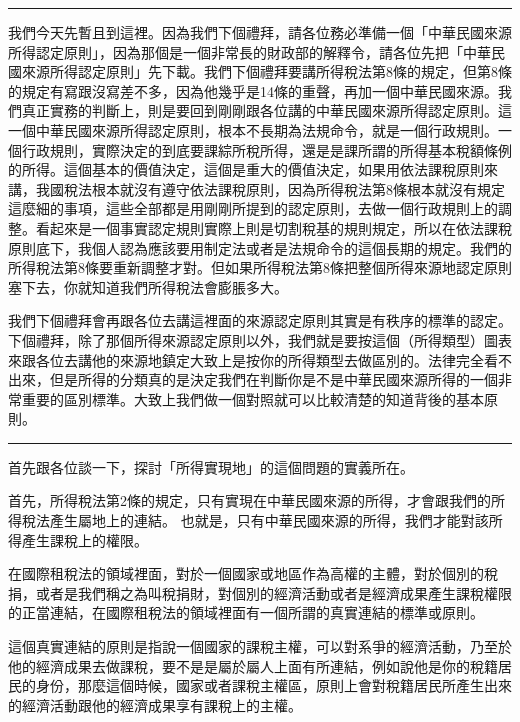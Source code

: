 \documentclass[oneside,sub3section]{ctexbook}
\begin{document}
\begin{center}\rule{0.5\linewidth}{0.5pt}\end{center}

我們今天先暫且到這裡。因為我們下個禮拜，請各位務必準備一個「中華民國來源所得認定原則」，因為那個是一個非常長的財政部的解釋令，請各位先把「中華民國來源所得認定原則」先下載。我們下個禮拜要講所得稅法第8條的規定，但第8條的規定有寫跟沒寫差不多，因為他幾乎是14條的重聲，再加一個中華民國來源。我們真正實務的判斷上，則是要回到剛剛跟各位講的中華民國來源所得認定原則。這一個中華民國來源所得認定原則，根本不長期為法規命令，就是一個行政規則。一個行政規則，實際決定的到底要課綜所稅所得，還是是課所謂的所得基本稅額條例的所得。這個基本的價值決定，這個是重大的價值決定，如果用依法課稅原則來講，我國稅法根本就沒有遵守依法課稅原則，因為所得稅法第8條根本就沒有規定這麼細的事項，這些全部都是用剛剛所提到的認定原則，去做一個行政規則上的調整。看起來是一個事實認定規則實際上則是切割稅基的規則規定，所以在依法課稅原則底下，我個人認為應該要用制定法或者是法規命令的這個長期的規定。我們的所得稅法第8條要重新調整才對。但如果所得稅法第8條把整個所得來源地認定原則塞下去，你就知道我們所得稅法會膨脹多大。

我們下個禮拜會再跟各位去講這裡面的來源認定原則其實是有秩序的標準的認定。下個禮拜，除了那個所得來源認定原則以外，我們就是要按這個（所得類型）圖表來跟各位去講他的來源地鎮定大致上是按你的所得類型去做區別的。法律完全看不出來，但是所得的分類真的是決定我們在判斷你是不是中華民國來源所得的一個非常重要的區別標準。大致上我們做一個對照就可以比較清楚的知道背後的基本原則。

\begin{center}\rule{0.5\linewidth}{0.5pt}\end{center}

首先跟各位談一下，探討「所得實現地」的這個問題的實義所在。

首先，所得稅法第2條的規定，只有實現在中華民國來源的所得，才會跟我們的所得稅法產生屬地上的連結。
也就是，只有中華民國來源的所得，我們才能對該所得產生課稅上的權限。

在國際租稅法的領域裡面，對於一個國家或地區作為高權的主體，對於個別的稅捐，或者是我們稱之為叫稅捐財，對個別的經濟活動或者是經濟成果產生課稅權限的正當連結，在國際租稅法的領域裡面有一個所謂的真實連結的標準或原則。

這個真實連結的原則是指說一個國家的課稅主權，可以對系爭的經濟活動，乃至於他的經濟成果去做課稅，要不是是屬於屬人上面有所連結，例如說他是你的稅籍居民的身份，那麼這個時候，國家或者課稅主權區，原則上會對稅籍居民所產生出來的經濟活動跟他的經濟成果享有課稅上的主權。
\end{document}
